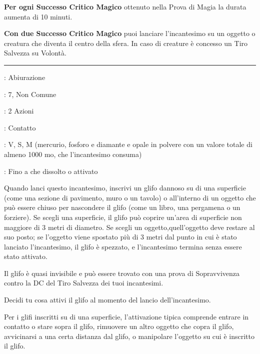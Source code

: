 \begin{multicols}{2}
\textbf{Per ogni Successo Critico Magico} ottenuto nella Prova di Magia la durata aumenta di 10 minuti.

\textbf{Con due Successo Critico Magico} puoi lanciare l'incantesimo su un oggetto o creatura che diventa il centro della sfera. In caso di creature è concesso un Tiro Salvezza su Volontà.

\smallskip\noindent\rule{\linewidth}{2pt} \hypertarget{Simbolo}{}\medskip{}
\noindent
\begin{description}[noitemsep, topsep=0pt, parsep=0pt, partopsep=0pt, leftmargin=0cm, labelwidth=2.8cm]
	\item[\textbf{Lista di Magia}]: Abiurazione
	\item[\textbf{Livello}]: 7, Non Comune
	\item[\textbf{T. di Lancio}]: 2 Azioni
	\item[\textbf{Gittata}]: Contatto
	\item[\textbf{Componenti}]: V, S, M (mercurio, fosforo e diamante e opale in polvere con un valore totale di almeno 1000 mo, che l'incantesimo consuma)
	\item[\textbf{Durata}]: Fino a che dissolto o attivato
\end{description}

Quando lanci questo incantesimo, inscrivi un glifo dannoso su di una superficie (come una sezione di pavimento, muro o un tavolo) o all'interno di un oggetto che può essere chiuso per nascondere il glifo (come un libro, una pergamena o un forziere). Se scegli una superficie, il glifo può coprire un'area di superficie non maggiore di 3 metri di diametro. Se scegli un oggetto,quell'oggetto deve restare al suo posto; se l'oggetto viene spostato più di 3 metri dal punto in cui è stato lanciato l'incantesimo, il glifo è spezzato, e l'incantesimo termina senza essere stato attivato.

Il glifo è quasi invisibile e può essere trovato con una prova di Sopravvivenza contro la DC del Tiro Salvezza dei tuoi incantesimi.

Decidi tu cosa attivi il glifo al momento del lancio dell'incantesimo.

Per i glifi inscritti su di una superficie, l'attivazione tipica comprende entrare in contatto o stare sopra il glifo, rimuovere un altro oggetto che copra il glifo, avvicinarsi a una certa distanza dal glifo, o manipolare l'oggetto su cui è inscritto il glifo.


\end{multicols}
